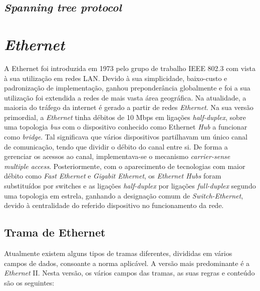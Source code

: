 \subsection{\textit{Spanning tree protocol}}


\section{\textit{Ethernet}}
\label{section:model}
 A Ethernet foi introduzida em 1973 pelo grupo de trabalho IEEE 802.3 com vista à sua utilização em redes LAN. Devido à sua simplicidade, baixo-custo e padronização de implementação, ganhou preponderância globalmente e foi a sua utilização foi extendida a redes de mais vasta área geográfica. Na atualidade, a maioria do tráfego da internet é gerado a partir de redes \textit{Ethernet}. Na sua versão primordial, a \textit{Ethernet} tinha débitos de 10 Mbps em ligações \textit{half-duplex}, sobre uma topologia \textit{bus} com o dispositivo conhecido como Ethernet \textit{Hub} a funcionar como \textit{bridge}. Tal significava que vários dispositivos partilhavam um único canal de comunicação, tendo que dividir o débito do canal entre si. De forma a gerenciar os acessos ao canal, implementava-se o mecanismo \textit{carrier-sense multiple access}. Posteriormente, com o aparecimento de tecnologias com maior débito como \textit{Fast Ethernet} e \textit{Gigabit Ethernet}, os \textit{Ethernet Hubs} foram substituídos por switches e as ligações \textit{half-duplex} por ligações \textit{full-duplex} segundo uma topologia em estrela, ganhando a designação comum de \textit{Switch-Ethernet}, devido à centralidade do referido dispositivo no funcionamento da rede. \par 
 
 \subsection{Trama de Ethernet}
 
Atualmente existem alguns tipos de tramas diferentes, divididas em vários campos de dados, consoante a norma aplicável. A versão mais predominante é a \textit{Ethernet} II. Nesta versão, os vários campos das tramas, as suas regras e conteúdo são os seguintes: 

